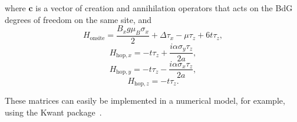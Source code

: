 where $\bm{c}$ is a vector of creation and annihilation operators that acts on the BdG degrees of freedom on the same site, and
\begin{equation}
H_{\textrm{onsite}} = \frac{B_{x} g \mu_{B} \sigma_{x}}{2} + \Delta \tau_{x} - \mu \tau_{z} + 6 t \tau_{z},
\end{equation}
\begin{equation}
H_{\textrm{hop},x} = -t \tau_{z} + \frac{i \alpha \sigma_{y} \tau_{z}}{2 a},
\end{equation}
\begin{equation}
H_{\textrm{hop},y} = -t \tau_{z} - \frac{i \alpha \sigma_{x} \tau_{z}}{2 a},
\end{equation}
\begin{equation}
H_{\textrm{hop},z} = -t \tau_{z}.
\end{equation}



These matrices can easily be implemented in a numerical model, for example, using the Kwant package~\cite{Groth2014}.

